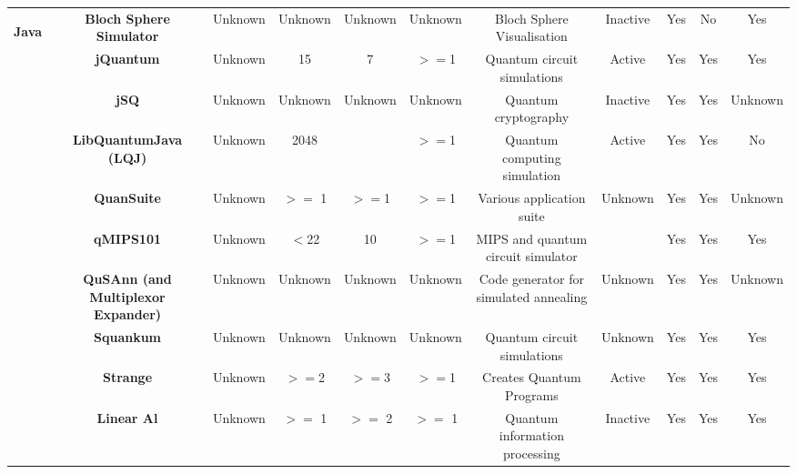 \documentclass[conference]{IEEEtran}
\begin{document}
\begin{table*}[h!]
{\begin{tabular}{c|c|c|c|c|c|c|c|c|c|c}
	\multirow{10}{*}{\begin{sideways}\textbf{Java}\end{sideways}} & \textbf{Bloch Sphere Simulator} & Unknown & Unknown & Unknown & Unknown & Bloch Sphere Visualisation & Inactive & Yes   & No    & Yes \\
	           & \textbf{jQuantum} & Unknown & 15    & 7     &$>=$1  & Quantum circuit simulations & Active & Yes   & Yes   & Yes \\
	           & \textbf{jSQ} & Unknown & Unknown & Unknown & Unknown & Quantum cryptography & Inactive & Yes   & Yes   & Unknown \\
	           & \textbf{LibQuantumJava (LQJ) } & Unknown &   2048  &       &$>=$1  & Quantum computing simulation & Active & Yes   & Yes   & No \\
	           & \textbf{QuanSuite } & Unknown & $>=$ 1 &$>=$1  &$>=$1  & Various application suite & Unknown & Yes   & Yes   & Unknown \\
	           & \textbf{qMIPS101 } & Unknown &$<$22  & 10    &$>=$1  & MIPS and quantum circuit simulator &       & Yes   & Yes   & Yes \\
	           & \textbf{QuSAnn (and Multiplexor Expander) } & Unknown & Unknown & Unknown & Unknown & Code generator for simulated annealing & Unknown & Yes   & Yes   & Unknown \\
	           & \textbf{Squankum } & Unknown & Unknown & Unknown & Unknown & Quantum circuit simulations & Unknown & Yes   & Yes   & Yes \\
	           & \textbf{Strange } & Unknown &$>=$2  &$>=$3  &$>=$1  & Creates Quantum Programs & Active & Yes   & Yes   & Yes \\
               & \textbf{Linear Al } & Unknown & $>=$ 1  & $>=$ 2   & $>=$ 1  & Quantum information processing & Inactive & Yes   & Yes   & Yes \\ \hline
	



\end{tabular}}
\end{table*}
\end{document}
